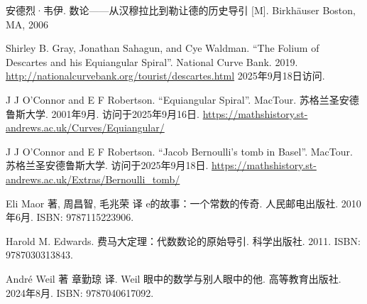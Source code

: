安德烈·韦伊. 数论——从汉穆拉比到勒让德的历史导引 [M]. Birkhäuser Boston, MA, 2006 %

Shirley B. Gray, Jonathan Sahagun, and Cye Waldman. ``The Folium of Descartes and his Equiangular Spiral''. National Curve Bank. 2019. \url{http://nationalcurvebank.org/tourist/descartes.html} 2025年9月18日访问.

J J O'Connor and E F Robertson. ``Equiangular Spiral''. MacTour. 苏格兰圣安德鲁斯大学. 2001年9月. 访问于2025年9月16日. \url{https://mathshistory.st-andrews.ac.uk/Curves/Equiangular/}

J J O'Connor and E F Robertson. ``Jacob Bernoulli's tomb in Basel''. MacTour. 苏格兰圣安德鲁斯大学. 访问于2025年9月18日. \url{https://mathshistory.st-andrews.ac.uk/Extras/Bernoulli_tomb/}

Eli Maor 著, 周昌智, 毛兆荣 译 e的故事：一个常数的传奇. 人民邮电出版社. 2010年6月. ISBN: 9787115223906.

Harold M. Edwards. 费马大定理：代数数论的原始导引. 科学出版社. 2011. ISBN: 9787030313843.

André Weil 著 章勤琼 译. Weil 眼中的数学与别人眼中的他. 高等教育出版社. 2024年8月. ISBN: 9787040617092.
